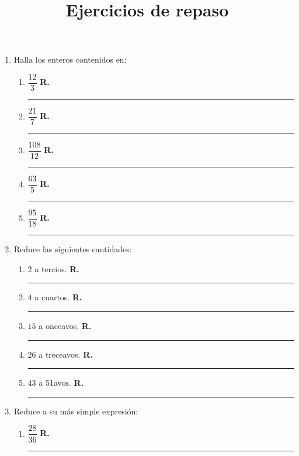 

\title{Ejercicios de repaso \vspace{-2cm}}
\author{}
\date{ }



\maketitle
\fontsize{14}{14}\selectfont

\begin{enumerate}
\item Halla los enteros contenidos en:
\begin{enumerate}[label=\alph*)]
\item $\dfrac{12}{3}$ \hspace{0.3cm} \textbf{R.} \rule{3cm}{0.1mm}
\item $\dfrac{21}{7}$ \hspace{0.3cm} \textbf{R.} \rule{3cm}{0.1mm}
\item $\dfrac{108}{12}$ \hspace{0.3cm} \textbf{R.} \rule{3cm}{0.1mm}
\item $\dfrac{63}{5}$ \hspace{0.3cm} \textbf{R.} \rule{3cm}{0.1mm}
\item $\dfrac{95}{18}$ \hspace{0.3cm} \textbf{R.} \rule{3cm}{0.1mm}
\end{enumerate}
\item Reduce las siguientes cantidades:
\begin{enumerate}[label=\alph*)]
\item $2$ a tercios. \hspace{0.3cm} \textbf{R.} \rule{3cm}{0.1mm}
\item $4$ a cuartos. \hspace{0.3cm} \textbf{R.} \rule{3cm}{0.1mm}
\item $15$ a onceavos. \hspace{0.3cm} \textbf{R.} \rule{3cm}{0.1mm}
\item $26$ a treceavos. \hspace{0.3cm} \textbf{R.} \rule{3cm}{0.1mm}
\item $43$ a 51avos. \hspace{0.3cm} \textbf{R.} \rule{3cm}{0.1mm}
\end{enumerate}
\item Reduce a su más simple expresión:
\begin{enumerate}[label=\alph*)]
\item $\dfrac{28}{36}$ \hspace{0.3cm} \textbf{R.} \rule{3cm}{0.1mm}

\end{enumerate}
\end{enumerate}
